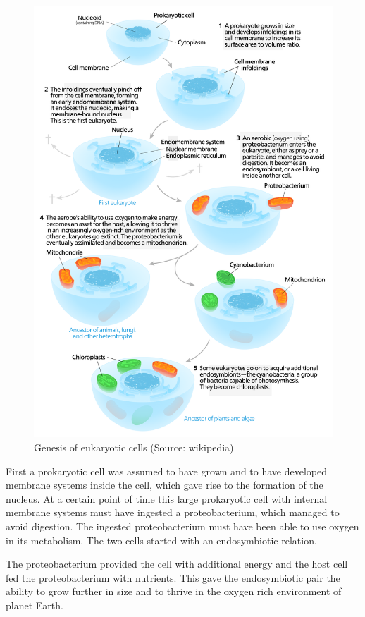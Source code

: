 \documentclass[
  11pt,
]{book}
\begin{document}
\begin{figure}

{\centering \includegraphics[width=0.8\linewidth]{./figs/endosymbiosis} 

}

\caption{Genesis of eukaryotic cells (Source: wikipedia)}\label{fig:endosymbiosis}
\end{figure}

First a prokaryotic cell was assumed to have grown and to have developed membrane systems inside the cell, which gave rise to the formation of the nucleus. At a certain point of time this large prokaryotic cell with internal membrane systems must have ingested a proteobacterium, which managed to avoid digestion. The ingested proteobacterium must have been able to use oxygen in its metabolism. The two cells started with an endosymbiotic relation.

The proteobacterium provided the cell with additional energy and the host cell fed the proteobacterium with nutrients. This gave the endosymbiotic pair the ability to grow further in size and to thrive in the oxygen rich environment of planet Earth.
\end{document}
